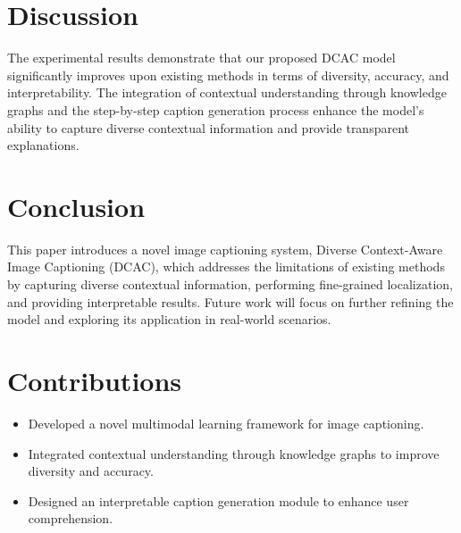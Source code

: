 \documentclass{article}
\begin{document}
\section{Discussion}
The experimental results demonstrate that our proposed DCAC model significantly improves upon existing methods in terms of diversity, accuracy, and interpretability. The integration of contextual understanding through knowledge graphs and the step-by-step caption generation process enhance the model's ability to capture diverse contextual information and provide transparent explanations.

\section{Conclusion}
This paper introduces a novel image captioning system, Diverse Context-Aware Image Captioning (DCAC), which addresses the limitations of existing methods by capturing diverse contextual information, performing fine-grained localization, and providing interpretable results. Future work will focus on further refining the model and exploring its application in real-world scenarios.

\section{Contributions}
\begin{itemize}
    \item Developed a novel multimodal learning framework for image captioning.
    \item Integrated contextual understanding through knowledge graphs to improve diversity and accuracy.
    \item Designed an interpretable caption generation module to enhance user comprehension.
\end{itemize}



\end{document}
